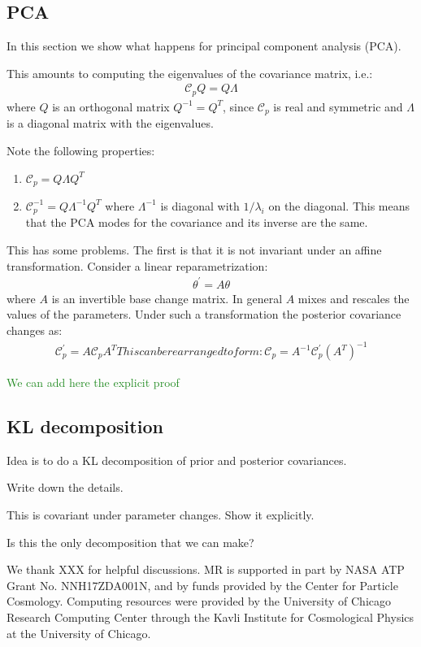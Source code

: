 \documentclass[aps,nofootinbib,notitlepage,superscriptaddress,twocolumn,10pt,prd]{revtex4-1}
\newcommand{\mr}[1]{\textcolor{ForestGreen}{#1}}
\begin{document}
%
\subsection{PCA}
%
In this section we show what happens for principal component analysis (PCA).

This amounts to computing the eigenvalues of the covariance matrix, i.e.:
\begin{align}
\mathcal{C}_p Q = Q \Lambda
\end{align}
where $Q$ is an orthogonal matrix $Q^{-1} = Q^T$, since $\mathcal{C}_p$ is real and symmetric and $\Lambda$ is a diagonal matrix with the eigenvalues.

Note the following properties:
\begin{enumerate}
\item $\mathcal{C}_p = Q \Lambda Q^T$
\item $\mathcal{C}_p^{-1} = Q \Lambda^{-1} Q^T$ where $\Lambda^{-1}$ is diagonal with $1/\lambda_i$ on the diagonal. This means that the PCA modes for the covariance and its inverse are the same.
\end{enumerate}

This has some problems. The first is that it is not invariant under an affine transformation.
Consider a linear reparametrization:
\begin{align}
\theta^\prime = A \theta
\end{align}
where $A$ is an invertible base change matrix. In general $A$ mixes and rescales the values of the parameters.
Under such a transformation the posterior covariance changes as:
\begin{align}
\mathcal{C}_p^\prime = A \mathcal{C}_p A^T
This can be rearranged to form:
\mathcal{C}_p = A^{-1} \mathcal{C}_p^\prime (A^T)^{-1}

\end{align}

\mr{We can add here the explicit proof}

%
\subsection{KL decomposition}
%

Idea is to do a KL decomposition of prior and posterior covariances.

Write down the details.

This is covariant under parameter changes. Show it explicitly.

Is this the only decomposition that we can make?



%
\begin{acknowledgments}
%
We thank
XXX
for helpful discussions.
%
MR is supported in part by NASA ATP Grant No. NNH17ZDA001N, and by funds provided by the Center for Particle Cosmology.
%
Computing resources were provided by the University of Chicago Research Computing Center through the Kavli Institute for Cosmological Physics at the University of Chicago.
%
\end{acknowledgments}
%


%
\end{document}
